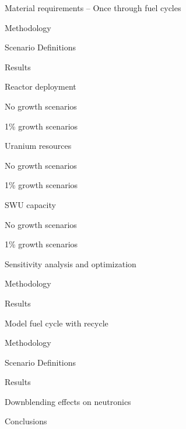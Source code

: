 \documentclass{report}
\begin{document}
\begin{outline}
\begin{outline}
\end{outline}

\item Material requirements -- Once through fuel cycles
\begin{outline}
    \item Methodology
    \item Scenario Definitions
    \item Results
    \begin{outline}
        \item Reactor deployment
        \begin{outline}
            \item No growth scenarios
            \item 1\% growth scenarios
        \end{outline}
        \item Uranium resources
        \begin{outline}
            \item No growth scenarios
            \item 1\% growth scenarios
        \end{outline}
        \item SWU capacity
        \begin{outline}
            \item No growth scenarios
            \item 1\% growth scenarios
        \end{outline}
    \end{outline}
\end{outline}

\item Sensitivity analysis and optimization
\begin{outline}
    \item Methodology
    \item Results
\end{outline}

\item Model fuel cycle with recycle 
\begin{outline}
    \item Methodology
    \item Scenario Definitions
    \item Results
\end{outline}

\item Downblending effects on neutronics

\item Conclusions
\end{outline}




\end{document}
